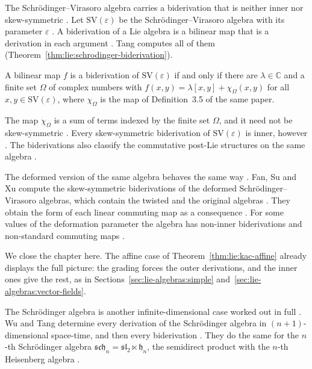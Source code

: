 The Schrödinger--Virasoro algebra carries a biderivation that is neither inner
nor skew-symmetric \cite[p.~1]{Tang2016Schrodinger}. Let
$\mathrm{SV}(\varepsilon)$ be the Schrödinger--Virasoro algebra with its
parameter $\varepsilon$ \cite[p.~1]{Tang2016Schrodinger}. A biderivation of a
Lie algebra is a bilinear map that is a derivation in each argument
\cite[p.~2]{Tang2016Schrodinger}. Tang computes all of them
(Theorem~\ref{thm:lie:schrodinger-biderivation}).

\begin{theorem}\label{thm:lie:schrodinger-biderivation}
A bilinear map $f$ is a biderivation of $\mathrm{SV}(\varepsilon)$ if and only if
there are $\lambda\in\mathbb{C}$ and a finite set $\Omega$ of complex numbers
with $f(x,y)=\lambda[x,y]+\chi_{\Omega}(x,y)$ for all $x,y\in\mathrm{SV}(\varepsilon)$,
where $\chi_{\Omega}$ is the map of Definition~3.5 of the same paper.
\end{theorem}

The map $\chi_{\Omega}$ is a sum of terms indexed by the finite set $\Omega$,
and it need not be skew-symmetric \cite[p.~9]{Tang2016Schrodinger}. Every
skew-symmetric biderivation of $\mathrm{SV}(\varepsilon)$ is inner, however
\cite[Corollary~3.7, p.~10]{Tang2016Schrodinger}. The biderivations also
classify the commutative post-Lie structures on the same algebra
\cite[Theorem~4.3, p.~12]{Tang2016Schrodinger}.

The deformed version of the same algebra behaves the same way
\cite[p.~1]{FanSuXu2016}. Fan, Su and Xu compute the skew-symmetric
biderivations of the deformed Schrödinger--Virasoro algebras, which contain
the twisted and the original algebras \cite[p.~1]{FanSuXu2016}. They obtain
the form of each linear commuting map as a consequence \cite[Theorem~4.3,
p.~11]{FanSuXu2016}. For some values of the deformation parameter the algebra
has non-inner biderivations and non-standard commuting maps
\cite[p.~1]{FanSuXu2016}.

We close the chapter here.  The affine case of
Theorem~\ref{thm:lie:kac-affine} already displays the full picture:
the grading forces the outer derivations, and the inner ones give the
rest, as in Sections~\ref{sec:lie-algebras:simple}
and~\ref{sec:lie-algebras:vector-fields}.

The Schr\"odinger algebra is another infinite-dimensional case worked out in
full \cite[Abstract]{WuTang2022Schrodinger}. Wu and Tang determine every derivation of the Schr\"odinger algebra in
$(n+1)$-dimensional space-time, and then every biderivation
\cite[Abstract]{WuTang2022Schrodinger}. They do the same for the $n$-th
Schr\"odinger algebra $\mathfrak{sch}_n=\mathfrak{sl}_2\ltimes\mathfrak{h}_n$,
the semidirect product with the $n$-th Heisenberg algebra
\cite[Abstract]{WuTang2023NthSchrodinger}.

